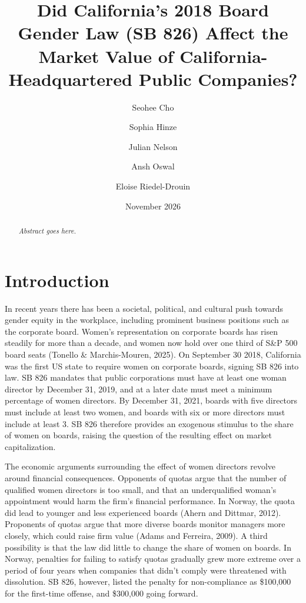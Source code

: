 \documentclass[12pt]{article}
\title{Did California's 2018 Board Gender Law (SB 826) Affect the Market Value of California-Headquartered Public Companies?}
\author{Seohee Cho \and Sophia Hinze \and Julian Nelson \and Ansh Oswal \and Eloise Riedel-Drouin}
\date{November 2026}
\begin{document}
\maketitle

\begin{abstract}
\textit{Abstract goes here.}
\end{abstract}

\section{Introduction}

In recent years there has been a societal, political, and cultural push towards gender equity in the workplace, including prominent business positions such as the corporate board. Women's representation on corporate boards has risen steadily for more than a decade, and women now hold over one third of S\&P 500 board seats (Tonello \& Marchis-Mouren, 2025). On September 30 2018, California was the first US state to require women on corporate boards, signing SB 826 into law. SB 826 mandates that public corporations must have at least one woman director by December 31, 2019, and at a later date must meet a minimum percentage of women directors. By December 31, 2021, boards with five directors must include at least two women, and boards with six or more directors must include at least 3. SB 826 therefore provides an exogenous stimulus to the share of women on boards, raising the question of the resulting effect on market capitalization.

The economic arguments surrounding the effect of women directors revolve around financial consequences. Opponents of quotas argue that the number of qualified women directors is too small, and that an underqualified woman's appointment would harm the firm's financial performance. In Norway, the quota did lead to younger and less experienced boards (Ahern and Dittmar, 2012). Proponents of quotas argue that more diverse boards monitor managers more closely, which could raise firm value (Adams and Ferreira, 2009). A third possibility is that the law did little to change the share of women on boards. In Norway, penalties for failing to satisfy quotas gradually grew more extreme over a period of four years when companies that didn't comply were threatened with dissolution. SB 826, however, listed the penalty for non-compliance as \$100,000 for the first-time offense, and \$300,000 going forward.
\end{document}
